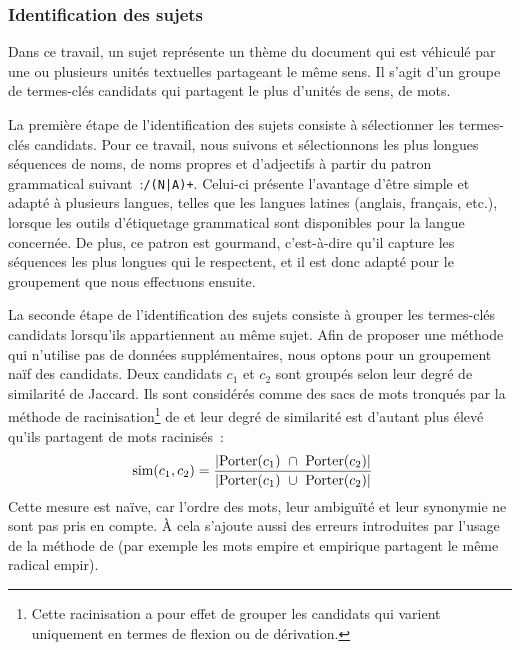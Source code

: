       \subsubsection{Identification des sujets}
      \label{subsubsec:main-automatic_keyphrase_annotation-unsupervised_automatic_keyphrase_extraction-topicrank-topic_identification}
        Dans ce travail, un sujet représente un thème du document qui est
        véhiculé par une ou plusieurs unités textuelles partageant le même
        sens. Il s'agit d'un groupe de termes-clés candidats qui partagent le
        plus d'unités de sens, de mots.

        La première étape de l'identification des sujets consiste à sélectionner
        les termes-clés candidats.
        Pour ce travail, nous suivons  et
        sélectionnons les plus longues séquences de noms, de noms propres et
        d'adjectifs à partir du patron grammatical suivant~:\texttt{/(N|A)+}.
        Celui-ci présente l'avantage d'être simple et adapté à plusieurs
        langues, telles que les langues latines (anglais, français, etc.),
        lorsque les outils d'étiquetage grammatical sont disponibles pour la
        langue concernée. De plus, ce patron est gourmand, c'est-à-dire qu'il
        capture les séquences les plus longues qui le respectent, et il est donc
        adapté pour le groupement que nous effectuons ensuite.

        La seconde étape de l'identification des sujets consiste à grouper les
        termes-clés candidats lorsqu'ils appartiennent au même sujet. Afin de
        proposer une méthode qui n'utilise pas de données
        supplémentaires, nous optons pour un groupement naïf des
        candidats. Deux candidats $c_1$ et $c_2$ sont groupés selon leur degré
        de similarité de Jaccard. Ils sont considérés comme des sacs de
        mots tronqués par la méthode de racinisation\footnote{Cette
        racinisation a pour effet de grouper les candidats qui varient
        uniquement en termes de flexion ou de dérivation.} de
         et leur degré de similarité est
        d'autant plus élevé qu'ils partagent de mots racinisés~:
        \begin{align}
          \text{sim}(c_1, c_2) &= \frac{|\textnormal{Porter}(c_1)\ \cap\ \textnormal{Porter}(c_2)|}{|\textnormal{Porter}(c_1)\ \cup\ \textnormal{Porter}(c_2)|} \label{equa:jaccard}
        \end{align}
        Cette mesure est naïve, car l'ordre des mots, leur ambiguïté
        et leur synonymie ne sont pas pris en compte. À cela s'ajoute
        aussi des erreurs introduites par l'usage de la méthode de
         (par exemple les mots
        \og{}empire\fg{} et \og{}empirique\fg{} partagent le même radical
        \og{}empir\fg{}).

